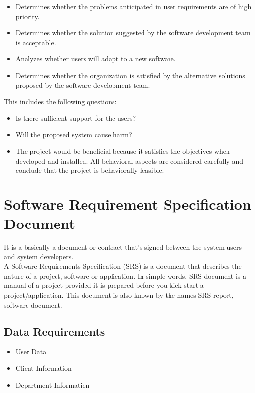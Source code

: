 \begin{itemize}
	\item Determines whether the problems anticipated in user requirements are of high priority.
	\item Determines whether the solution suggested by the software development team is acceptable.
	\item Analyzes whether users will adapt to a new software.
	\item Determines whether the organization is satisfied by the alternative solutions proposed by the software development team.
\end{itemize}

This includes the following questions:
\begin{itemize}
	\item Is there sufficient support for the users?
	\item Will the proposed system cause harm?
	\item The project would be beneficial because it satisfies the objectives when developed and installed. All behavioral aspects are considered carefully and conclude that the project is behaviorally feasible.
\end{itemize}





\section{Software Requirement Specification Document}

It is a basically a document or contract that's signed between the system users and system developers.\\
A Software Requirements Specification (SRS) is a document that describes the nature of a project, software or application. In simple words, SRS document is a manual of a project provided it is prepared before you kick-start a project/application. This document is also known by the names SRS report, software document.
\subsection{Data Requirements}
\begin{itemize}
	\item User Data
	\item Client Information
	\item Department Information
	\end{itemize}

